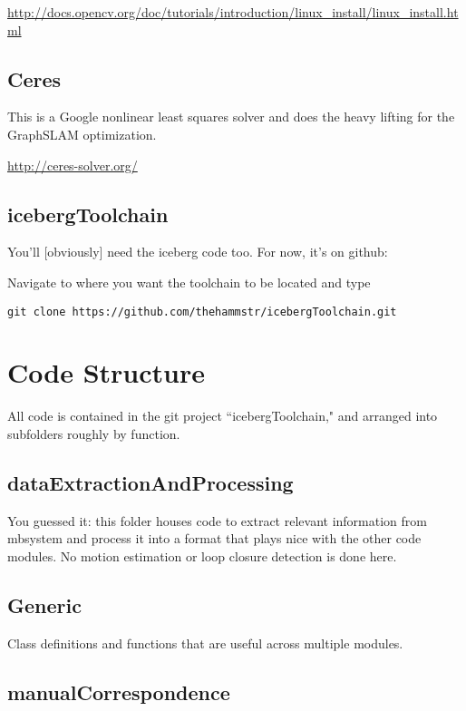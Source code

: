 \documentclass[12pt]{amsart}
\begin{document}
\url{http://docs.opencv.org/doc/tutorials/introduction/linux_install/linux_install.html}

\subsection{Ceres}
This is a Google nonlinear least squares solver and does the heavy lifting for the GraphSLAM optimization.

\url{http://ceres-solver.org/}

\subsection{icebergToolchain}

You'll [obviously] need the iceberg code too. For now, it's on github:

Navigate to where you want the toolchain to be located and type

\begin{lstlisting}
git clone https://github.com/thehammstr/icebergToolchain.git
\end{lstlisting}

\section{Code Structure}

All code is contained in the git project ``icebergToolchain," and arranged into subfolders roughly by function.

\subsection{dataExtractionAndProcessing}

You guessed it: this folder houses code to extract relevant information from mbsystem and process it into a format that plays nice with the other code modules. No motion estimation or loop closure detection is done here.

\subsection{Generic}

Class definitions and functions that are useful across multiple modules.

\subsection{manualCorrespondence}
\end{document}
